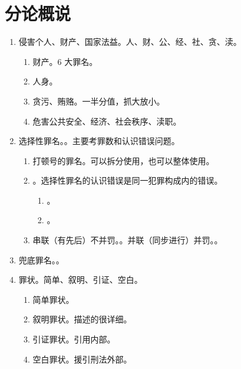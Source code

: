 \section{分论概说}
\begin{enumerate}
  \item 侵害个人、财产、国家法益。人、财、公、经、社、贪、渎。
        \begin{enumerate}
          \item 财产。6 大罪名。
          \item 人身。
          \item 贪污、贿赂。\sjt 一半分值，抓大放小。
          \item 危害公共安全、经济、社会秩序、渎职。
        \end{enumerate}
  \item 选择性罪名。。主要考罪数和认识错误问题。
        \begin{enumerate}
          \item 打顿号的罪名。可以拆分使用，也可以整体使用。
          \item {}。选择性罪名的认识错误是同一犯罪构成内的错误。
                \begin{enumerate}
                  \item {}。
                  \item {}。
                \end{enumerate}
          \item 串联（有先后）不并罚。。并联（同步进行）并罚。。
        \end{enumerate}
  \item 兜底罪名。。
  \item 罪状。简单、叙明、引证、空白。
        \begin{enumerate}
          \item 简单罪状。
          \item 叙明罪状。描述的很详细。
          \item 引证罪状。引用内部。
          \item 空白罪状。援引刑法外部。
        \end{enumerate}

\end{enumerate}
